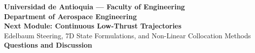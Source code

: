 \documentclass[aspectratio=169, 10pt]{beamer}
\begin{document}
\begin{frame}[plain]
    \begin{center}
        \vspace{1.0cm}
        {\Large \textbf{\textcolor{UdeAGreen}{Universidad de Antioquia --- Faculty of Engineering}}} \\
        \vspace{0.3cm}
        {\large \textbf{Department of Aerospace Engineering}} \\
        \vspace{0.8cm}
        {\LARGE \textbf{\textcolor{Charcoal}{Next Module: Continuous Low-Thrust Trajectories}}} \\
        \vspace{0.3cm}
        \small Edelbaum Steering, 7D State Formulations, and Non-Linear Collocation Methods \\
        \vspace{1.0cm}
        \textbf{Questions and Discussion}
    \end{center}
\end{frame}
\end{document}
